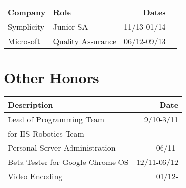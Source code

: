 \documentclass[twocolumn]{article}
\begin{document}
\begin{tabular}{| l | l | r | l |}
    Company & Role & Dates \\
    \hline
    Symplicity & Junior SA & 11/13-01/14 \\
    Microsoft & Quality Assurance & 06/12-09/13
\end{tabular}

\section{Other Honors}

\begin{tabular}{| l | r |}
    Description & Date \\ \hline
    Lead of Programming Team & 9/10-3/11 \\ 
    for HS Robotics Team & \\ \hline
    Personal Server Administration & 06/11-  \\ \hline
    Beta Tester for Google Chrome OS & 12/11-06/12 \\ \hline
    Video Encoding & 01/12- \\
\end{tabular}
\end{document}

